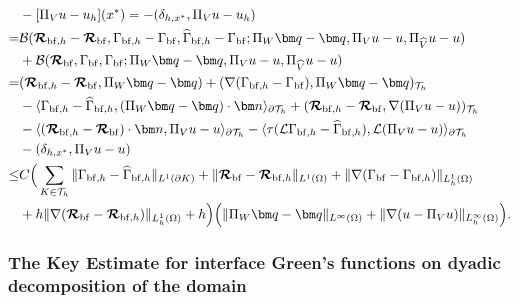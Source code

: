 \documentclass[1996/10/24]{amsart}
\theoremstyle{definition}
\numberwithin{equation}{section}
\begin{document}
\begin{align}
&-[\Pi_Vu-u_h](x^{\ast})=-(\delta_{h,x^{\ast}},\Pi_Vu-u_h)\nonumber\\
=&\mathcal{B}(\boldsymbol{\mathcal{R}}_{{\rm bf},h}-\boldsymbol{\mathcal{R}}_{{\rm bf}},\Gamma_{{\rm bf},h}-\Gamma_{{\rm bf}},\widehat{\Gamma}_{{\rm bf},h}
-\Gamma_{{\rm bf}};\Pi_W{\bm q}-{\bm q},\Pi_Vu-u,\Pi_{\widehat{V}}u-u)\nonumber\\
&+\mathcal{B}(\boldsymbol{\mathcal{R}}_{{\rm bf}},\Gamma_{{\rm bf}},\Gamma_{{\rm bf}};\Pi_W{\bm q}-{\bm q},\Pi_Vu-u,\Pi_{\widehat{V}}u-u)\nonumber\\
=&(\boldsymbol{\mathcal{R}}_{{\rm bf},h}-\boldsymbol{\mathcal{R}}_{{\rm bf}},\Pi_W{\bm q}-{\bm q})+
(\nabla(\Gamma_{{\rm bf},h}-\Gamma_{{\rm bf}}),\Pi_W{\bm q}-{\bm q})_{\mathcal{T}_h}\nonumber\\
&-\langle\Gamma_{{\rm bf},h}-\widehat{\Gamma}_{{\rm bf},h},(\Pi_W{\bm q}-{\bm q})\cdot{\bm n}\rangle_{\partial\mathcal{T}_h}
+(\boldsymbol{\mathcal{R}}_{{\rm bf},h}-\boldsymbol{\mathcal{R}}_{{\rm bf}},\nabla(\Pi_Vu-u))_{\mathcal{T}_h}\label{rG3:2}\\
&-\langle(\boldsymbol{\mathcal{R}}_{{\rm bf},h}-\boldsymbol{\mathcal{R}}_{{\rm bf}})\cdot{\bm n},\Pi_Vu-u\rangle_{\partial\mathcal{T}_h}
-\langle\tau(\mathcal{L}\Gamma_{{\rm bf},h}-\widehat{\Gamma}_{{\rm bf},h}),\mathcal{L}(\Pi_Vu-u)\rangle_{\partial\mathcal{T}_h}\nonumber\\
&-(\delta_{h,x^{\ast}},\Pi_Vu-u)\nonumber\\
\leq&C\Big(\sum_{K\in\mathcal{T}_h}\|\Gamma_{{\rm bf},h}-\widehat{\Gamma}_{{\rm bf},h}\|_{L^1(\partial K)}+\|\boldsymbol{\mathcal{R}}_{{\rm bf}}-\boldsymbol{\mathcal{R}}_{{\rm bf},h}\|_{L^1(\Omega)}+\|\nabla(\Gamma_{{\rm bf}}-\Gamma_{{\rm bf},h})\|_{L_h^1(\Omega)}\nonumber\\
&+h\|\nabla(\boldsymbol{\mathcal{R}}_{{\rm bf}}-\boldsymbol{\mathcal{R}}_{{\rm bf},h})\|_{L_h^1(\Omega)}+h\Big)
\Big(\|\Pi_W{\bm q}-{\bm q}\|_{L^{\infty}(\Omega)}+\|\nabla(u-\Pi_Vu)\|_{L_h^{\infty}(\Omega)}\Big).\nonumber
\end{align}

\subsubsection{The Key Estimate for interface Green's functions on dyadic decomposition of the domain}
\label{sec3:3.6}
\end{document}
